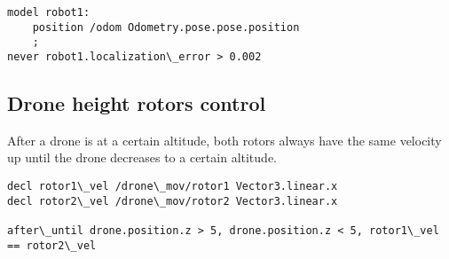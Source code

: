 \begin{lstlisting}
model robot1:
    position /odom Odometry.pose.pose.position
    ;
never robot1.localization\_error > 0.002
\end{lstlisting}


\subsection{Drone height rotors control}
\label{ssec:rotorsexample}

After a drone is at a certain altitude, both rotors always have the same velocity up until the drone decreases to a certain altitude.

\begin{lstlisting}
decl rotor1\_vel /drone\_mov/rotor1 Vector3.linear.x
decl rotor2\_vel /drone\_mov/rotor2 Vector3.linear.x

after\_until drone.position.z > 5, drone.position.z < 5, rotor1\_vel == rotor2\_vel
\end{lstlisting}
